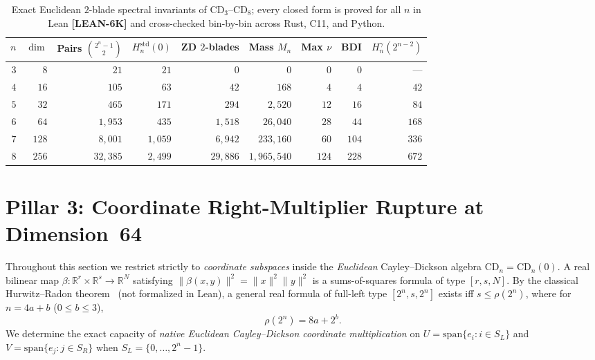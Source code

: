 \documentclass[11pt,reqno]{amsart}
\theoremstyle{plain}
\theoremstyle{definition}
\theoremstyle{remark}
\newcommand{\tagLean}{\mbox{\textsf{\textbf{\color{oiBlue}[LEAN-6K]}}}}
\newcommand{\CD}{\mathrm{CD}}
\newcommand{\R}{\mathbb{R}}
\newcommand{\std}{\mathrm{std}}
\begin{document}
\begin{table}[htbp]
\centering
\caption{Exact Euclidean $2$-blade spectral invariants of $\CD_3$--$\CD_8$; every closed form
is proved for all $n$ in Lean \tagLean{} and cross-checked bin-by-bin across Rust, C11, and Python.}
\label{tab:terrace_values}
\small
\begin{tabular}{@{}rrrrrrrrr@{}}
\toprule
$n$ & $\dim$ & Pairs $\binom{2^n-1}{2}$ & $H_n^{\std}(0)$ & ZD $2$-blades & Mass $M_n$ & Max $\nu$ & BDI & $H_n^\gamma(2^{n-2})$ \\
\midrule
$3$ & $8$   & $21$     & $21$    & $0$      & $0$           & $0$   & $0$   & --- \\
$4$ & $16$  & $105$    & $63$    & $42$     & $168$         & $4$   & $4$   & $42$ \\
$5$ & $32$  & $465$    & $171$   & $294$    & $2{,}520$     & $12$  & $16$  & $84$ \\
$6$ & $64$  & $1{,}953$ & $435$  & $1{,}518$ & $26{,}040$   & $28$  & $44$  & $168$ \\
$7$ & $128$ & $8{,}001$ & $1{,}059$ & $6{,}942$ & $233{,}160$ & $60$ & $104$ & $336$ \\
$8$ & $256$ & $32{,}385$ & $2{,}499$ & $29{,}886$ & $1{,}965{,}540$ & $124$ & $228$ & $672$ \\
\bottomrule
\end{tabular}
\end{table}

\section{Pillar 3: Coordinate Right-Multiplier Rupture at Dimension~64}
\label{sec:pillar3}

Throughout this section we restrict strictly to \emph{coordinate subspaces} inside the
\emph{Euclidean} Cayley--Dickson algebra $\CD_n = \CD_n(0)$. A real bilinear map
$\beta : \R^r \times \R^s \to \R^N$ satisfying $\|\beta(x, y)\|^2 = \|x\|^2 \|y\|^2$ is a
sums-of-squares formula of type $[r, s, N]$. By the classical Hurwitz--Radon
theorem~\cite{hurwitz1922,radon1922,adams1962} (not formalized in Lean), a general real formula
of full-left type $[2^n, s, 2^n]$ exists iff $s \le \rho(2^n)$, where for $n = 4a + b$
($0 \le b \le 3$),
\begin{equation}
  \rho(2^n) = 8a + 2^b.
\end{equation}
We determine the exact capacity of \emph{native Euclidean Cayley--Dickson coordinate
multiplication} on $U = \mathrm{span}\{e_i : i \in S_L\}$ and
$V = \mathrm{span}\{e_j : j \in S_R\}$ when $S_L = \{0, \dots, 2^n - 1\}$.
\end{document}
